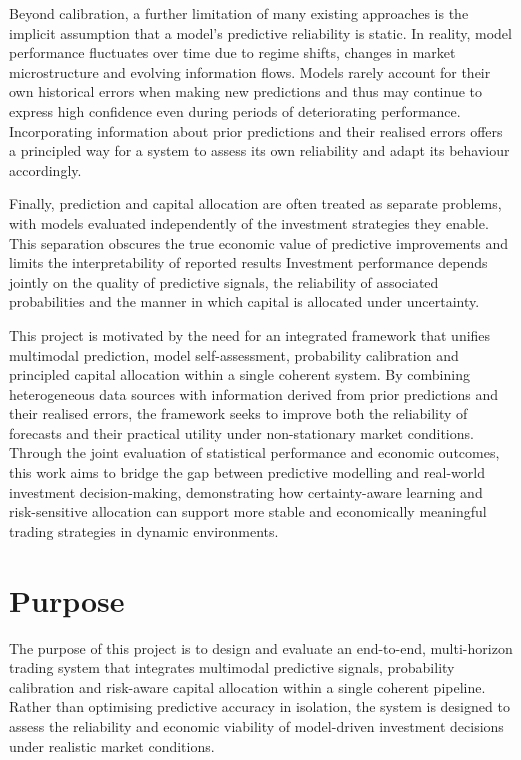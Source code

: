 \documentclass{l4proj}
\begin{document}
Beyond calibration, a further limitation of many existing approaches is the implicit assumption that a model's predictive reliability is static. In reality, model performance fluctuates over time due to regime shifts, changes in market microstructure and evolving information flows. Models rarely account for their own historical errors when making new predictions and thus may continue to express high confidence even during periods of deteriorating performance. Incorporating information about prior predictions and their realised errors offers a principled way for a system to assess its own reliability and adapt its behaviour accordingly.

Finally, prediction and capital allocation are often treated as separate problems, with models evaluated independently of the investment strategies they enable. This separation obscures the true economic value of predictive improvements and limits the interpretability of reported results Investment performance depends jointly on the quality of predictive signals, the reliability of associated probabilities and the manner in which capital is allocated under uncertainty.

This project is motivated by the need for an integrated framework that unifies multimodal prediction, model self-assessment, probability calibration and principled capital allocation within a single coherent system. By combining heterogeneous data sources with information derived from prior predictions and their realised errors, the framework seeks to improve both the reliability of forecasts and their practical utility under non-stationary market conditions. Through the joint evaluation of statistical performance and economic outcomes, this work aims to bridge the gap between predictive modelling and real-world investment decision-making, demonstrating how certainty-aware learning and risk-sensitive allocation can support more stable and economically meaningful trading strategies in dynamic environments.

\section{Purpose}

The purpose of this project is to design and evaluate an end-to-end, multi-horizon trading system that integrates multimodal predictive signals, probability calibration and risk-aware capital allocation within a single coherent pipeline. Rather than optimising predictive accuracy in isolation, the system is designed to assess the reliability and economic viability of model-driven investment decisions under realistic market conditions.
\end{document}
